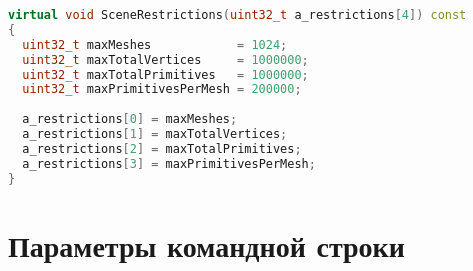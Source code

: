 \documentclass[11pt,fleqn,english,russian]{report} %
\begin{document}
\begin{lstlisting}[language=C++, 
	               caption=Пример реализации функции SceneRestrictions, 
	               label=lst:SceneRestrictions]	 
virtual void SceneRestrictions(uint32_t a_restrictions[4]) const
{
  uint32_t maxMeshes            = 1024;
  uint32_t maxTotalVertices     = 1000000;
  uint32_t maxTotalPrimitives   = 1000000;
  uint32_t maxPrimitivesPerMesh = 200000;
	
  a_restrictions[0] = maxMeshes;
  a_restrictions[1] = maxTotalVertices;
  a_restrictions[2] = maxTotalPrimitives;
  a_restrictions[3] = maxPrimitivesPerMesh;
}               
\end{lstlisting}

\chapter{Параметры командной строки}
\end{document}
